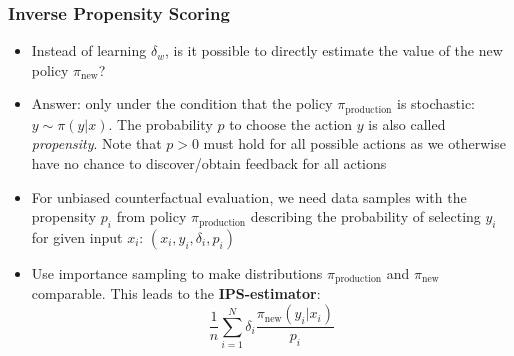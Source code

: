 \subsubsection{Inverse Propensity Scoring}
\begin{itemize}
	\item Instead of learning $\delta_w$, is it possible to directly estimate the value of the new policy $\pi_{\text{new}}$?
	\item Answer: only under the condition that the policy $\pi_{\text{production}}$ is stochastic: $y\sim \pi(y|x)$. The probability $p$ to choose the action $y$ is also called \textit{propensity}. Note that $p>0$ must hold for all possible actions as we otherwise have no chance to discover/obtain feedback for all actions
	\item For unbiased counterfactual evaluation, we need data samples with the propensity $p_i$ from policy $\pi_{\text{production}}$ describing the probability of selecting $y_i$ for given input $x_i$: $\left(x_i, y_i, \delta_i, p_i\right)$
	\item Use importance sampling to make distributions $\pi_{\text{production}}$ and $\pi_{\text{new}}$ comparable. This leads to the \textbf{IPS-estimator}:
	$$\frac{1}{n}\sum\limits_{i=1}^{N} \delta_i \frac{\pi_{\text{new}}(y_i|x_i)}{p_i}$$
\end{itemize}
